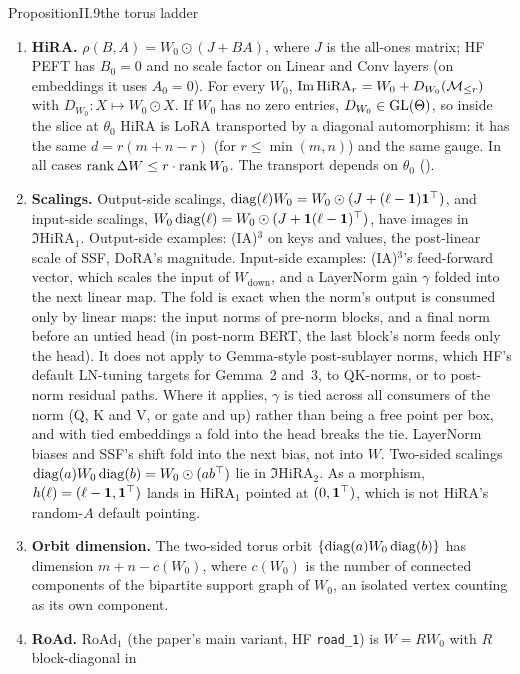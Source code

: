 \begin{restate}{Proposition}{II.9}{the torus ladder}
\begin{enumerate}[label=(\alph*)]
  \item \textbf{HiRA.} $\rho(B,A)=W_0\odot(J+BA)$, where $J$ is the all-ones matrix; HF PEFT has $B_0=0$ and no scale
    factor on Linear and Conv layers (on embeddings it uses $A_0=0$). For every $W_0$,
    $\operatorname{Im}\mathrm{HiRA}_r=W_0+D_{W_0}(\mathcal{M}_{\le r})$ with $D_{W_0}:X\mapsto W_0\odot X$. If $W_0$ has no zero entries,
    $D_{W_0}\in\mathrm{GL}(\Theta)$, so inside the slice at $\theta_0$ HiRA is LoRA transported by a diagonal automorphism: it has
    the same $d=r(m+n-r)$ (for $r\le\min(m,n)$) and the same gauge. In all cases $\operatorname{rank}\Delta W\le r\cdot\operatorname{rank} W_0$. The
    transport depends on $\theta_0$ ().
  \item \textbf{Scalings.} Output-side scalings, $\operatorname{diag}(\ell)W_0=W_0\odot(J+(\ell-\mathbf 1)\mathbf 1^{\top})$, and
    input-side scalings, $W_0\operatorname{diag}(\ell)=W_0\odot(J+\mathbf 1(\ell-\mathbf 1)^{\top})$, have images in $\Im\mathrm{HiRA}_1$.
    Output-side examples: (IA)$^3$ on keys and values, the post-linear scale of SSF, DoRA's magnitude. Input-side
    examples: (IA)$^3$'s feed-forward vector, which scales the input of $W_{\mathrm{down}}$, and a LayerNorm gain
    $\gamma$ folded into the next linear map. The fold is exact when the norm's output is consumed only by linear maps:
    the input norms of pre-norm blocks, and a final norm before an untied head (in post-norm BERT, the last block's norm
    feeds only the head). It does not apply to Gemma-style post-sublayer norms, which HF's default LN-tuning targets for
    Gemma~2 and~3, to QK-norms, or to post-norm residual paths. Where it applies, $\gamma$ is tied across all consumers of
    the norm (Q, K and V, or gate and up) rather than being a free point per box, and with tied embeddings a fold into
    the head breaks the tie. LayerNorm biases and SSF's shift fold into the next bias, not into $W$. Two-sided scalings
    $\operatorname{diag}(a)W_0\operatorname{diag}(b)=W_0\odot(ab^{\top})$ lie in $\Im\mathrm{HiRA}_2$. As a morphism, $h(\ell)=(\ell-\mathbf 1,\mathbf
    1^{\top})$ lands in $\mathrm{HiRA}_1$ pointed at $(0,\mathbf 1^{\top})$, which is not HiRA's random-$A$ default pointing.
  \item \textbf{Orbit dimension.} The two-sided torus orbit $\{\operatorname{diag}(a)W_0\operatorname{diag}(b)\}$ has dimension $m+n-c(W_0)$, where
    $c(W_0)$ is the number of connected components of the bipartite support graph of $W_0$, an isolated vertex counting
    as its own component.
  \item \textbf{RoAd.} RoAd$_1$ (the paper's main variant, HF \texttt{road\_1}) is $W=RW_0$ with $R$ block-diagonal in

\end{enumerate}
\end{restate}
